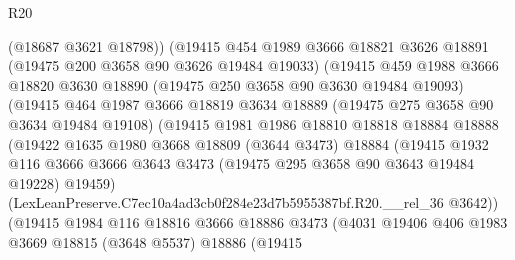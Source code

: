 \begin{lexlean}{R20}
\begin{coremodule}
                        (@18687 @3621 @18798))
                      (@19415
                        @454
                        @1989
                        @3666
                        @18821
                        @3626
                        @18891
                        (@19475 @200 @3658 @90 @3626 @19484 @19033)
                        (@19415
                          @459
                          @1988
                          @3666
                          @18820
                          @3630
                          @18890
                          (@19475 @250 @3658 @90 @3630 @19484 @19093)
                          (@19415
                            @464
                            @1987
                            @3666
                            @18819
                            @3634
                            @18889
                            (@19475 @275 @3658 @90 @3634 @19484 @19108)
                            (@19415
                              @1981
                              @1986
                              @18810
                              @18818
                              @18884
                              @18888
                              (@19422
                                @1635
                                @1980
                                @3668
                                @18809
                                (@3644 @3473)
                                @18884
                                (@19415
                                  @1932
                                  @116
                                  @3666
                                  @3666
                                  @3643
                                  @3473
                                  (@19475 @295 @3658 @90 @3643 @19484 @19228)
                                  @19459)
                                (LexLeanPreserve.C7ec10a4ad3cb0f284e23d7b5955387bf.R20.__rel_36
                                  @3642))
                              (@19415
                                @1984
                                @116
                                @18816
                                @3666
                                @18886
                                @3473
                                (@4031
                                  @19406
                                  @406
                                  @1983
                                  @3669
                                  @18815
                                  (@3648 @5537)
                                  @18886
                                  (@19415

\end{coremodule}
\end{lexlean}

